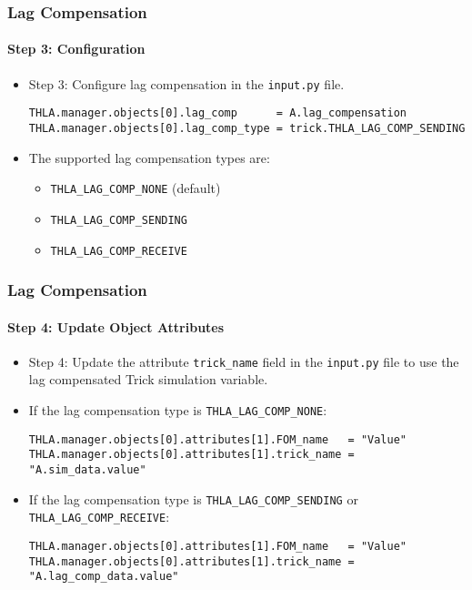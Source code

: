    \begin{frame}[fragile]
      \frametitle{Lag Compensation}
      \framesubtitle{Step 3: Configuration}
      \begin{itemize}
         \item Step 3: Configure lag compensation in the \texttt{input.py} file.
         \vspace{0.2cm}
\begin{Verbatim}[frame=single, fontsize=\scriptsize]
THLA.manager.objects[0].lag_comp      = A.lag_compensation
THLA.manager.objects[0].lag_comp_type = trick.THLA_LAG_COMP_SENDING
\end{Verbatim}
      \item The supported lag compensation types are:
         \begin{itemize}
            \item \texttt{THLA\_LAG\_COMP\_NONE}  (default)
            \item \texttt{THLA\_LAG\_COMP\_SENDING}
            \item \texttt{THLA\_LAG\_COMP\_RECEIVE}
         \end{itemize}
      \end{itemize}
   \end{frame}

   \begin{frame}[fragile]
      \frametitle{Lag Compensation}
      \framesubtitle{Step 4: Update Object Attributes}
      \begin{itemize}
         \item Step 4: Update the attribute \texttt{trick\_name} field in the
         \texttt{input.py} file to use the lag compensated Trick simulation variable.
         \item If the lag compensation type is \texttt{THLA\_LAG\_COMP\_NONE}:
         \vspace{0.2cm}
\begin{Verbatim}[frame=single, fontsize=\scriptsize]
THLA.manager.objects[0].attributes[1].FOM_name   = "Value"
THLA.manager.objects[0].attributes[1].trick_name = "A.sim_data.value"
\end{Verbatim}
      \item If the lag compensation type is \texttt{THLA\_LAG\_COMP\_SENDING}
      or \texttt{THLA\_LAG\_COMP\_RECEIVE}:
         \vspace{0.2cm}
\begin{Verbatim}[frame=single, fontsize=\scriptsize]
THLA.manager.objects[0].attributes[1].FOM_name   = "Value"
THLA.manager.objects[0].attributes[1].trick_name = "A.lag_comp_data.value"
\end{Verbatim}
      \end{itemize}
   \end{frame}

